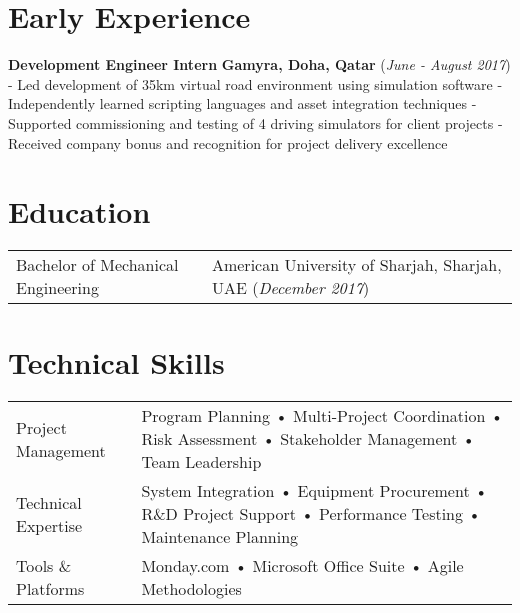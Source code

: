 \documentclass[a4paper,12pt]{article}
\begin{document}
\section{Early Experience}

\textbf{Development Engineer Intern}  
\textbf{Gamyra, Doha, Qatar} (\textit{June - August 2017})
- Led development of 35km virtual road environment using simulation software  
- Independently learned scripting languages and asset integration techniques  
- Supported commissioning and testing of 4 driving simulators for client projects  
- Received company bonus and recognition for project delivery excellence  

\section{Education}
\begin{tabularx}{\linewidth}{@{}l X@{}}
Bachelor of Mechanical Engineering & American University of Sharjah, Sharjah, UAE (\textit{December 2017}) \\
\end{tabularx}

\section{Technical Skills}
\begin{tabularx}{\linewidth}{@{}l X@{}}
Project Management & Program Planning • Multi-Project Coordination • Risk Assessment • Stakeholder Management • Team Leadership \\
Technical Expertise & System Integration • Equipment Procurement • R\&D Project Support • Performance Testing • Maintenance Planning \\
Tools \& Platforms & Monday.com • Microsoft Office Suite • Agile Methodologies \\
\end{tabularx}

\end{document}
